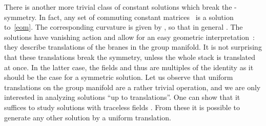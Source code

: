 \documentclass[12pt,a4paper]{article}
\def\tF{{\rm F}}
\def\tA{{\rm A}}
\begin{document}
There is another more trivial class of constant solutions which break 
the \coordHE{}-symmetry. In fact, any set of commuting constant matrices~\myHighlight{$\tA_{\mu}$}\coordHE{} 
is  a solution to~\eqref{eom}. The corresponding curvature is given 
by \myHighlight{$\tF_{\mu\nu}={f_{\mu\nu}}^{\sigma}\tA_{\sigma}$}\coordHE{}, so that in general
\myHighlight{$[\tF_{\mu\nu},\:\cdot\:]\neq 0$}\coordHE{}. The solutions have vanishing action 
and allow for an easy geometric interpretation~\cite{Recknagel:1998ih,
Alekseev:2000fd}:  
they describe translations of the branes in the group manifold. It is 
not surprising that these translations break the symmetry, unless the 
whole stack is translated at once. In the latter case, the fields \myHighlight{$\tA$}\coordHE{} 
and thus \myHighlight{$\tF$}\coordHE{} are multiples of the identity as it should be the case 
for a symmetric solution. Let us observe that uniform translations on the 
group manifold are a rather trivial operation, and we are only interested
in analyzing solutions ``up to translations''. One can show that it suffices 
to study solutions with traceless fields \myHighlight{$\tA(g)$}\coordHE{}. From these it is possible
to generate any other solution by a uniform translation.
\medskip 
\end{document}
